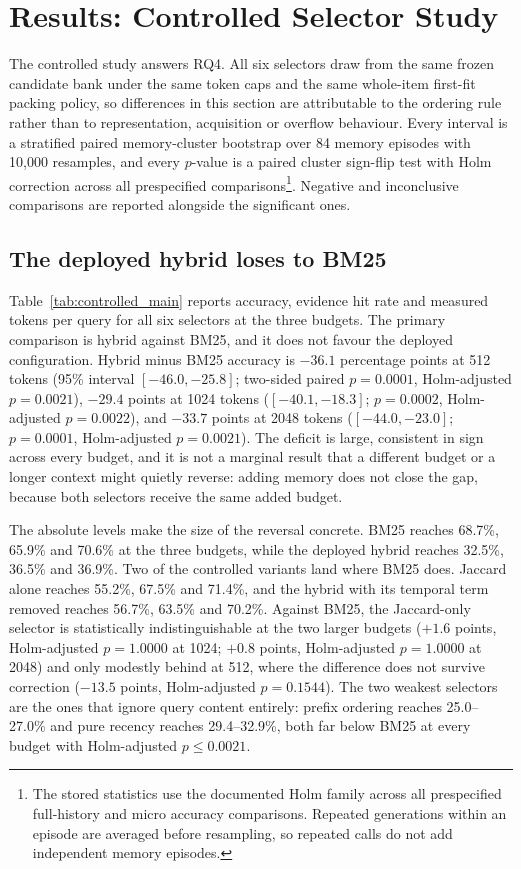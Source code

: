 \section{Results: Controlled Selector Study}

\label{sec:controlled_results}

The controlled study answers RQ4. All six selectors draw from the same frozen
candidate bank under the same token caps and the same whole-item first-fit packing
policy, so differences in this section are attributable to the ordering rule rather
than to representation, acquisition or overflow behaviour. Every interval is a
stratified paired memory-cluster bootstrap over 84 memory episodes with 10{,}000
resamples, and every $p$-value is a paired cluster sign-flip test with Holm
correction across all prespecified comparisons\footnote{The stored statistics use
the documented Holm family across all prespecified full-history and micro accuracy
comparisons. Repeated generations within an episode are averaged before resampling,
so repeated calls do not add independent memory episodes.}.
Negative and inconclusive comparisons are reported alongside the significant ones.

\subsection{The deployed hybrid loses to BM25}

\label{sec:ctrl_main}

Table~\ref{tab:controlled_main} reports accuracy, evidence hit rate and measured
tokens per query for all six selectors at the three budgets. The primary comparison
is hybrid against BM25, and it does not favour the deployed configuration. Hybrid
minus BM25 accuracy is $-36.1$ percentage points at 512 tokens (95\% interval
$[-46.0,-25.8]$; two-sided paired $p=0.0001$, Holm-adjusted $p=0.0021$), $-29.4$
points at 1024 tokens ($[-40.1,-18.3]$; $p=0.0002$, Holm-adjusted $p=0.0022$), and
$-33.7$ points at 2048 tokens ($[-44.0,-23.0]$; $p=0.0001$, Holm-adjusted
$p=0.0021$). The deficit is large, consistent in sign across every budget, and it is
not a marginal result that a different budget or a longer context might quietly
reverse: adding memory does not close the gap, because both selectors receive the
same added budget.

The absolute levels make the size of the reversal concrete. BM25 reaches 68.7\%,
65.9\% and 70.6\% at the three budgets, while the deployed hybrid reaches 32.5\%,
36.5\% and 36.9\%. Two of the controlled variants land where BM25 does. Jaccard
alone reaches 55.2\%, 67.5\% and 71.4\%, and the hybrid with its temporal term
removed reaches 56.7\%, 63.5\% and 70.2\%. Against BM25, the Jaccard-only selector
is statistically indistinguishable at the two larger budgets ($+1.6$ points,
Holm-adjusted $p=1.0000$ at 1024; $+0.8$ points, Holm-adjusted $p=1.0000$ at 2048)
and only modestly behind at 512, where the difference does not survive correction
($-13.5$ points, Holm-adjusted $p=0.1544$). The two weakest selectors are the ones
that ignore query content entirely: prefix ordering reaches 25.0--27.0\% and pure
recency reaches 29.4--32.9\%, both far below BM25 at every budget with Holm-adjusted
$p\le 0.0021$.

